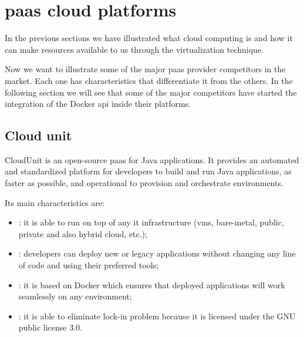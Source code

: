 %
%
\section{\acs{paas} cloud platforms}
\label{sec:background-cloudPlatform}
In the previous sections we have illustrated what cloud computing is and how it can make resources
available to us through the virtualization technique. 

Now we want to illustrate some of the major \ac{paas} provider competitors in the market. Each one 
has characteristics that differentiate it from the others. In the following section we will see that
some of the major competitors have started the integration of the Docker \ac{api} inside their platforms.

\subsection*{Cloud unit}
\label{sec:background-cloudPlatform-cloudUnit}
CloudUnit \cite{cloudUnitHomepage} is an open-source \ac{paas} for Java applications. It provides an
automated and standardized platform for developers to build and run Java applications, as faster as
possible, and operational to provision and orchestrate environments.

Its main characteristics are:

\begin{itemize}
	\item{: it is able to run on top of any \acs{it} infrastructure
		(\ac{vm}s, bare-metal, public, private and also hybrid cloud, etc.);}
	\item{: developers can deploy new or legacy applications without changing any line
		of code and using their preferred tools;}
	\item{: it is based on Docker which ensures that deployed applications will
		work seamlessly on any environment;}
	\item{: it is able to eliminate lock-in problem because it is licensed under
		the GNU public license 3.0.}
\end{itemize}

